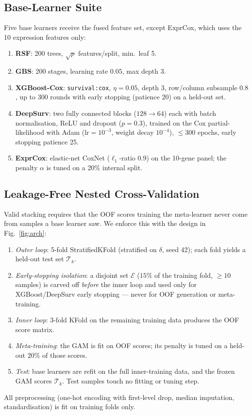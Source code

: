 \documentclass[journal]{IEEEtran}
\begin{document}
\subsection{Base-Learner Suite}
\label{sec:base}
Five base learners receive the fused feature set, except ExprCox, which uses
the 10 expression features only:
\begin{enumerate}
  \item \textbf{RSF}: 200 trees, $\sqrt{p}$ features/split, min.\ leaf 5.
  \item \textbf{GBS}: 200 stages, learning rate $0.05$, max depth 3.
  \item \textbf{XGBoost-Cox}: \texttt{survival:cox}, $\eta{=}0.05$, depth 3,
        row/column subsample $0.8$, up to 300 rounds with early stopping
        (patience 20) on a held-out set.
  \item \textbf{DeepSurv}: two fully connected blocks
        ($128\!\to\!64$) each with batch normalisation, ReLU and dropout
        ($p{=}0.3$), trained on the Cox partial-likelihood with Adam
        ($\mathrm{lr}{=}10^{-3}$, weight decay $10^{-4}$), $\leq300$ epochs,
        early stopping patience 25.
  \item \textbf{ExprCox}: elastic-net CoxNet ($\ell_1$-ratio $0.9$) on the
        10-gene panel; the penalty $\alpha$ is tuned on a 20\% internal split.
\end{enumerate}

\subsection{Leakage-Free Nested Cross-Validation}
\label{sec:nested_cv}
Valid stacking requires that the OOF scores training the meta-learner never
come from samples a base learner saw. We enforce this with the design in
Fig.~\ref{fig:arch}:
\begin{enumerate}
  \item \emph{Outer loop}: 5-fold StratifiedKFold (stratified on $\delta$,
        seed 42); each fold yields a held-out test set $\mathcal{T}_k$.
  \item \emph{Early-stopping isolation}: a disjoint set $\mathcal{E}$
        ($15\%$ of the training fold, $\geq10$ samples) is carved off
        \emph{before} the inner loop and used only for XGBoost/DeepSurv
        early stopping --- never for OOF generation or meta-training.
  \item \emph{Inner loop}: 3-fold KFold on the remaining training data
        produces the OOF score matrix.
  \item \emph{Meta-training}: the GAM is fit on OOF scores; its penalty is
        tuned on a held-out 20\% of those scores.
  \item \emph{Test}: base learners are refit on the full inner-training data,
        and the frozen GAM scores $\mathcal{T}_k$. Test samples touch no
        fitting or tuning step.
\end{enumerate}
All preprocessing (one-hot encoding with first-level drop, median imputation,
standardisation) is fit on training folds only.
\end{document}
